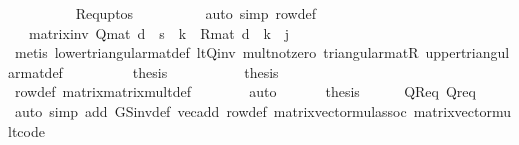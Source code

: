 \begin{isabellebody}
\ \ \ \ \ \ \ \ \isamarkupfalse%
\ R{\isacharunderscore}{\kern0pt}eq{\isacharunderscore}{\kern0pt}upto{\isacharunderscore}{\kern0pt}s\isanewline
\ \ \ \ \ \ \ \ \isamarkupfalse%
\ {\isacharparenleft}{\kern0pt}auto\ simp{\isacharcolon}{\kern0pt}\ row{\isacharunderscore}{\kern0pt}def{\isacharparenright}{\kern0pt}\isanewline
\ \ \ \ \ \ \isamarkupfalse%
\ \isamarkupfalse%
\ {\isachardoublequoteopen}{\isasymdots}\ {\isacharequal}{\kern0pt}\ matrix{\isacharunderscore}{\kern0pt}inv\ {\isacharparenleft}{\kern0pt}Q{\isacharunderscore}{\kern0pt}mat\ d{\isacharprime}{\kern0pt}{\isacharparenright}{\kern0pt}\ {\isachardollar}{\kern0pt}\ s\ {\isachardollar}{\kern0pt}\ k\ {\isacharasterisk}{\kern0pt}\ R{\isacharunderscore}{\kern0pt}mat\ d{\isacharprime}{\kern0pt}\ {\isachardollar}{\kern0pt}\ k\ {\isachardollar}{\kern0pt}\ j{\isachardoublequoteclose}\isanewline
\ \ \ \ \ \ \ \ \isamarkupfalse%
\ {\isacharparenleft}{\kern0pt}metis\ lower{\isacharunderscore}{\kern0pt}triangular{\isacharunderscore}{\kern0pt}mat{\isacharunderscore}{\kern0pt}def\ lt{\isacharunderscore}{\kern0pt}Q{\isacharunderscore}{\kern0pt}inv\ mult{\isacharunderscore}{\kern0pt}not{\isacharunderscore}{\kern0pt}zero\ triangular{\isacharunderscore}{\kern0pt}mat{\isacharunderscore}{\kern0pt}R\ upper{\isacharunderscore}{\kern0pt}triangular{\isacharunderscore}{\kern0pt}mat{\isacharunderscore}{\kern0pt}def{\isacharparenright}{\kern0pt}\isanewline
\ \ \ \ \ \ \isamarkupfalse%
\ \isamarkupfalse%
\ {\isacharquery}{\kern0pt}thesis\isacommand{{\isachardot}{\kern0pt}}\isamarkupfalse%
\isanewline
\ \ \ \ \isamarkupfalse%
\isanewline
\ \ \ \ \isamarkupfalse%
\ {\isacharquery}{\kern0pt}thesis\isanewline
\ \ \ \ \ \ \isamarkupfalse%
\ row{\isacharunderscore}{\kern0pt}def\ matrix{\isacharunderscore}{\kern0pt}matrix{\isacharunderscore}{\kern0pt}mult{\isacharunderscore}{\kern0pt}def\isanewline
\ \ \ \ \ \ \isamarkupfalse%
\ auto\isanewline
\ \ \isamarkupfalse%
\isanewline
\ \ \isamarkupfalse%
\ {\isacharquery}{\kern0pt}thesis\isanewline
\ \ \ \ \isamarkupfalse%
\ QR{\isacharunderscore}{\kern0pt}eq\ Qr{\isacharunderscore}{\kern0pt}eq\isanewline
\ \ \ \ \isamarkupfalse%
\ {\isacharparenleft}{\kern0pt}auto\ simp\ add{\isacharcolon}{\kern0pt}\ GS{\isacharunderscore}{\kern0pt}inv{\isacharunderscore}{\kern0pt}def\ vec{\isachardot}{\kern0pt}add\ row{\isacharunderscore}{\kern0pt}def\ matrix{\isacharunderscore}{\kern0pt}vector{\isacharunderscore}{\kern0pt}mul{\isacharunderscore}{\kern0pt}assoc\ matrix{\isacharunderscore}{\kern0pt}vector{\isacharunderscore}{\kern0pt}mult{\isacharunderscore}{\kern0pt}code{\isacharprime}{\kern0pt}{\isacharparenright}{\kern0pt}\isanewline

\end{isabellebody}
